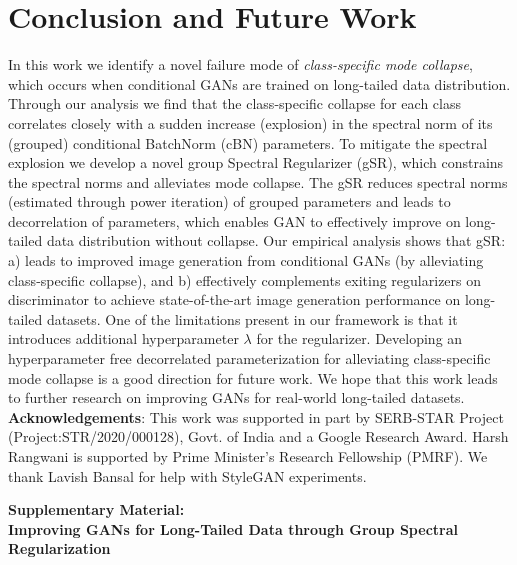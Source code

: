 \documentclass[runningheads,table]{llncs}
\begin{document}
\section{Conclusion and Future Work}
In this work we identify a novel failure mode of \textit{class-specific mode collapse}, which occurs when conditional GANs are trained on long-tailed data distribution. Through our analysis we find that the class-specific collapse for each class correlates closely with a sudden increase (explosion) in the spectral norm of its (grouped) conditional BatchNorm  (cBN) parameters. To mitigate the spectral explosion we develop a novel group Spectral Regularizer (gSR), which constrains the spectral norms and alleviates mode collapse. The gSR reduces spectral norms (estimated through power iteration) of grouped parameters and leads to decorrelation of parameters, which enables GAN to effectively improve on long-tailed data distribution without collapse. Our empirical analysis shows that gSR:  a) leads to improved image generation from conditional GANs (by alleviating class-specific collapse), and b) effectively complements exiting regularizers on discriminator to achieve state-of-the-art image generation performance on long-tailed datasets. One of the limitations present in our framework is that it introduces additional hyperparameter $\lambda$ for the regularizer. Developing an hyperparameter free decorrelated parameterization for alleviating class-specific mode collapse is a good direction for future work. We hope that this work leads to further research on improving GANs for real-world long-tailed datasets. \\
\textbf{Acknowledgements}: This work was supported in part by  SERB-STAR Project (Project:STR/2020/000128), Govt. of India and a Google Research Award. Harsh Rangwani is supported by Prime Minister's Research Fellowship (PMRF). We thank Lavish Bansal for help with StyleGAN experiments. 



\clearpage

\appendix

\renewcommand \thepart{}
\renewcommand \partname{}

\noindent
\begin{center}
\textbf{\Large Supplementary Material: \\ Improving GANs for Long-Tailed Data through Group Spectral Regularization} 
\end{center}
\renewcommand{\labelitemii}{$\circ$}
\end{document}
